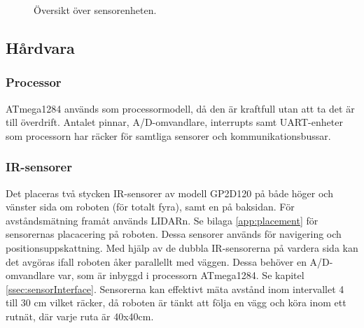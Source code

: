 \documentclass[a4paper,11pt]{article}
\begin{document}
\begin{figure}[h!]
	\caption{Översikt över sensorenheten.}
	\label{fig:unitSensor}
\end{figure}

\clearpage

\subsection{Hårdvara}

\subsubsection{Processor}
ATmega1284 används som processormodell, då den är kraftfull utan att ta det är till överdrift. Antalet pinnar, A/D-omvandlare, interrupts samt UART-enheter som processorn har räcker för samtliga sensorer och kommunikationsbussar.

\subsubsection{IR-sensorer} \label{sssec:sonicsensors}
Det placeras två stycken IR-sensorer av modell GP2D120 på både höger och vänster sida om roboten (för totalt fyra), samt en på baksidan. För avståndsmätning framåt används LIDARn. Se bilaga \ref{app:placement} för sensorernas placacering på roboten. Dessa sensorer används för navigering och positionsuppskattning. Med hjälp av de dubbla IR-sensorerna på vardera sida kan det avgöras ifall roboten åker parallellt med väggen. Dessa behöver en A/D-omvandlare var, som är inbyggd i processorn ATmega1284. Se kapitel \ref{ssec:sensorInterface}. Sensorerna kan effektivt mäta avstånd inom intervallet 4 till 30 cm vilket räcker, då roboten är tänkt att följa en vägg och köra inom ett rutnät, där varje ruta är 40x40cm.
\end{document}
